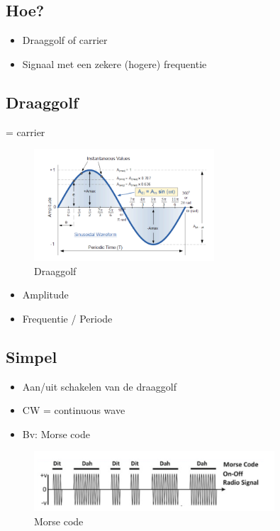 \documentclass{article}
\begin{document}
\subsection{Hoe?}
\begin{itemize}
    \item Draaggolf of carrier
    \item Signaal met een zekere (hogere) frequentie
\end{itemize}

\subsection{Draaggolf}
= carrier

\begin{figure}[H]
    \centering
    \includegraphics[width=0.6\textwidth]{Screenshot_20200302_115827.png}
    \caption{Draaggolf}
\end{figure}

\begin{itemize}
    \item Amplitude
    \item Frequentie / Periode
\end{itemize}

\subsection{Simpel}
\begin{itemize}
    \item Aan/uit schakelen van de draaggolf
    \item CW = continuous wave
    \item Bv: Morse code
\end{itemize}

\begin{figure}[H]
    \centering
    \includegraphics[width=0.8\textwidth]{Screenshot_20200302_120000.png}
    \caption{Morse code}
\end{figure}
\end{document}
